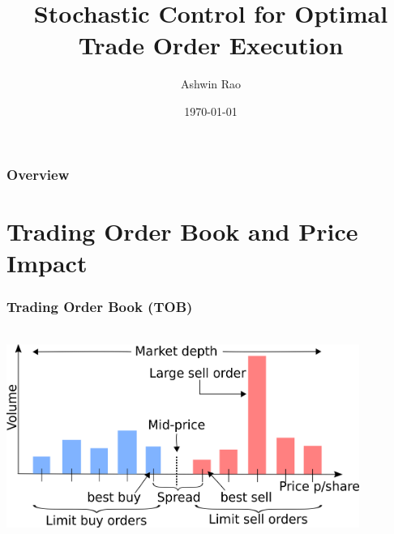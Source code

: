 \documentclass[handout]{beamer}
\title[Optimal Trade Order Execution]{Stochastic Control for Optimal Trade Order Execution} %
\author{Ashwin Rao} %
\institute[Stanford] %
{
ICME, Stanford University
}
\date{\today} %
\begin{document}
\begin{frame}
\titlepage %
\end{frame}

\begin{frame}
\frametitle{Overview} %
\tableofcontents %
\end{frame}

\section{Trading Order Book and Price Impact}

\begin{frame}
\frametitle{Trading Order Book (TOB)}
\includegraphics[width=11.5cm, height=7cm]{order_book.png}
\end{frame}
\end{document}
